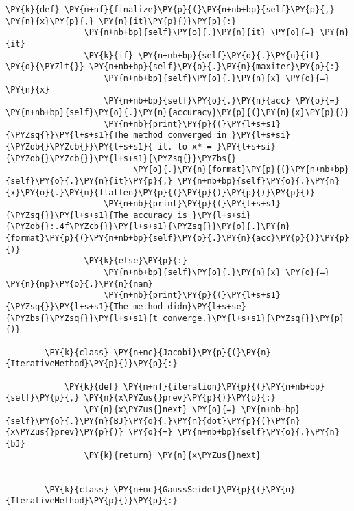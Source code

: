 \begin{Verbatim}[commandchars=\\\{\}]
            \PY{k}{def} \PY{n+nf}{finalize}\PY{p}{(}\PY{n+nb+bp}{self}\PY{p}{,} \PY{n}{x}\PY{p}{,} \PY{n}{it}\PY{p}{)}\PY{p}{:}
                \PY{n+nb+bp}{self}\PY{o}{.}\PY{n}{it} \PY{o}{=} \PY{n}{it}
                \PY{k}{if} \PY{n+nb+bp}{self}\PY{o}{.}\PY{n}{it} \PY{o}{\PYZlt{}} \PY{n+nb+bp}{self}\PY{o}{.}\PY{n}{maxiter}\PY{p}{:}
                    \PY{n+nb+bp}{self}\PY{o}{.}\PY{n}{x} \PY{o}{=} \PY{n}{x}
                    \PY{n+nb+bp}{self}\PY{o}{.}\PY{n}{acc} \PY{o}{=} \PY{n+nb+bp}{self}\PY{o}{.}\PY{n}{accuracy}\PY{p}{(}\PY{n}{x}\PY{p}{)}
                    \PY{n+nb}{print}\PY{p}{(}\PY{l+s+s1}{\PYZsq{}}\PY{l+s+s1}{The method converged in }\PY{l+s+si}{\PYZob{}\PYZcb{}}\PY{l+s+s1}{ it. to x* = }\PY{l+s+si}{\PYZob{}\PYZcb{}}\PY{l+s+s1}{\PYZsq{}}\PYZbs{}
                          \PY{o}{.}\PY{n}{format}\PY{p}{(}\PY{n+nb+bp}{self}\PY{o}{.}\PY{n}{it}\PY{p}{,} \PY{n+nb+bp}{self}\PY{o}{.}\PY{n}{x}\PY{o}{.}\PY{n}{flatten}\PY{p}{(}\PY{p}{)}\PY{p}{)}\PY{p}{)}
                    \PY{n+nb}{print}\PY{p}{(}\PY{l+s+s1}{\PYZsq{}}\PY{l+s+s1}{The accuracy is }\PY{l+s+si}{\PYZob{}:.4f\PYZcb{}}\PY{l+s+s1}{\PYZsq{}}\PY{o}{.}\PY{n}{format}\PY{p}{(}\PY{n+nb+bp}{self}\PY{o}{.}\PY{n}{acc}\PY{p}{)}\PY{p}{)}
                \PY{k}{else}\PY{p}{:}
                    \PY{n+nb+bp}{self}\PY{o}{.}\PY{n}{x} \PY{o}{=} \PY{n}{np}\PY{o}{.}\PY{n}{nan}
                    \PY{n+nb}{print}\PY{p}{(}\PY{l+s+s1}{\PYZsq{}}\PY{l+s+s1}{The method didn}\PY{l+s+se}{\PYZbs{}\PYZsq{}}\PY{l+s+s1}{t converge.}\PY{l+s+s1}{\PYZsq{}}\PY{p}{)}
        
        \PY{k}{class} \PY{n+nc}{Jacobi}\PY{p}{(}\PY{n}{IterativeMethod}\PY{p}{)}\PY{p}{:}
        
            \PY{k}{def} \PY{n+nf}{iteration}\PY{p}{(}\PY{n+nb+bp}{self}\PY{p}{,} \PY{n}{x\PYZus{}prev}\PY{p}{)}\PY{p}{:}
                \PY{n}{x\PYZus{}next} \PY{o}{=} \PY{n+nb+bp}{self}\PY{o}{.}\PY{n}{BJ}\PY{o}{.}\PY{n}{dot}\PY{p}{(}\PY{n}{x\PYZus{}prev}\PY{p}{)} \PY{o}{+} \PY{n+nb+bp}{self}\PY{o}{.}\PY{n}{bJ}
                \PY{k}{return} \PY{n}{x\PYZus{}next}
        
        
        \PY{k}{class} \PY{n+nc}{GaussSeidel}\PY{p}{(}\PY{n}{IterativeMethod}\PY{p}{)}\PY{p}{:}    
        

\end{Verbatim}
